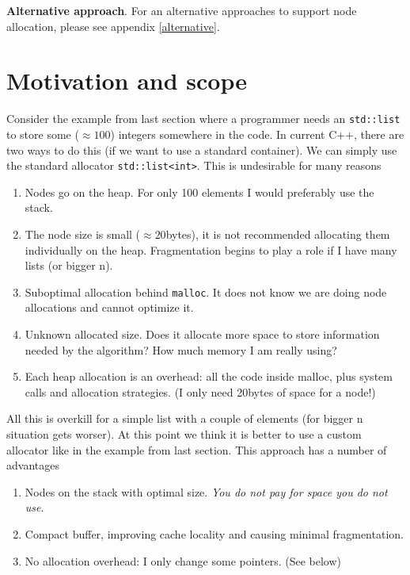 \documentclass[11pt]{article}
\begin{document}
\medskip
\noindent
{\bf Alternative approach}. For an alternative approaches to support
node allocation, please see appendix \ref{alternative}.

\section{Motivation and scope}

Consider the example from last section where a programmer needs an
\texttt{std::list} to store some ($\approx 100$) integers somewhere
in the code. In current C++, there are two ways to do this (if we want
to use a standard container). We can simply use the standard allocator
\texttt{std::list<int>}.  This is undesirable for many reasons
\begin{enumerate}
\item Nodes go on the heap. For only 100 elements I would preferably
use the stack.
\item The node size is small ($\approx 20$bytes), it is not recommended
allocating them individually on the heap. Fragmentation begins to play a role
if I have many lists (or bigger n).
\item Suboptimal allocation behind \texttt{malloc}. It does not
know we are doing node allocations and cannot optimize it.
\item Unknown allocated size. Does it allocate more space to store information
needed by the algorithm? How much memory I am really using?
\item  Each heap allocation is an overhead: all the code inside malloc, plus
system calls and allocation strategies. (I only need 20bytes of space for a
node!)
\end{enumerate}

All this is overkill for a simple list with a couple of elements
(for bigger n situation gets worser). At this point we think it is
better to use a custom allocator like in the example from last section.
This approach has a number of advantages
\begin{enumerate}
\item Nodes on the stack with optimal size. {\it You do not pay for space you do not use}.
\item Compact buffer, improving cache locality and causing
minimal fragmentation.
\item No allocation overhead: I only change some pointers. (See below)
\end{enumerate}
\end{document}
